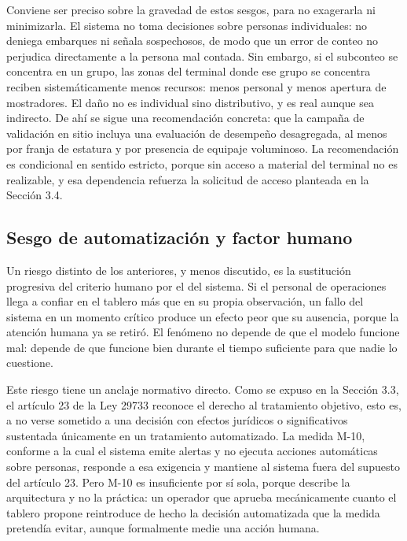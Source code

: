 Conviene ser preciso sobre la gravedad de estos sesgos, para no
exagerarla ni minimizarla. El sistema no toma decisiones sobre personas
individuales: no deniega embarques ni señala sospechosos, de modo que un
error de conteo no perjudica directamente a la persona mal contada. Sin
embargo, si el subconteo se concentra en un grupo, las zonas del
terminal donde ese grupo se concentra reciben sistemáticamente menos
recursos: menos personal y menos apertura de mostradores. El daño no es
individual sino distributivo, y es real aunque sea indirecto. De ahí se
sigue una recomendación concreta: que la campaña de validación en sitio
incluya una evaluación de desempeño desagregada, al menos por franja de
estatura y por presencia de equipaje voluminoso. La recomendación es
condicional en sentido estricto, porque sin acceso a material del
terminal no es realizable, y esa dependencia refuerza la solicitud de
acceso planteada en la Sección 3.4.

\subsection{Sesgo de automatización y factor humano}
\label{sec:impacto-social}

Un riesgo distinto de los anteriores, y menos discutido, es la
sustitución progresiva del criterio humano por el del sistema. Si el
personal de operaciones llega a confiar en el tablero más que en su
propia observación, un fallo del sistema en un momento crítico produce
un efecto peor que su ausencia, porque la atención humana ya se retiró.
El fenómeno no depende de que el modelo funcione mal: depende de que
funcione bien durante el tiempo suficiente para que nadie lo cuestione.

Este riesgo tiene un anclaje normativo directo. Como se expuso en la
Sección 3.3, el artículo 23 de la Ley 29733 reconoce el derecho al
tratamiento objetivo, esto es, a no verse sometido a una decisión con
efectos jurídicos o significativos sustentada únicamente en un
tratamiento automatizado. La medida M-10, conforme a la cual el sistema
emite alertas y no ejecuta acciones automáticas sobre personas, responde
a esa exigencia y mantiene al sistema fuera del supuesto del artículo
23. Pero M-10 es insuficiente por sí sola, porque describe la
arquitectura y no la práctica: un operador que aprueba mecánicamente
cuanto el tablero propone reintroduce de hecho la decisión automatizada
que la medida pretendía evitar, aunque formalmente medie una acción
humana.

